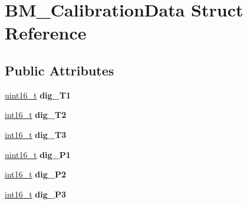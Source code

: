 \hypertarget{structBM__CalibrationData}{}\section{B\+M\+\_\+\+Calibration\+Data Struct Reference}
\label{structBM__CalibrationData}
\subsection*{Public Attributes}
\begin{DoxyCompactItemize}
\item 
\mbox{\label{structBM__CalibrationData_a1f0f0ad502c7ad302d1d75c41897326c}} 
\hyperlink{vl53l0x__types_8h_a273cf69d639a59973b6019625df33e30}{uint16\+\_\+t} {\bfseries dig\+\_\+\+T1}
\item 
\mbox{\label{structBM__CalibrationData_a5fa3b1681b52b9f3ef94c4600b464f24}} 
\hyperlink{vl53l0x__types_8h_aa343fa3b3d06292b959ffdd4c4703b06}{int16\+\_\+t} {\bfseries dig\+\_\+\+T2}
\item 
\mbox{\label{structBM__CalibrationData_a6a95bd8dc6e4750b4370c5277e762621}} 
\hyperlink{vl53l0x__types_8h_aa343fa3b3d06292b959ffdd4c4703b06}{int16\+\_\+t} {\bfseries dig\+\_\+\+T3}
\item 
\mbox{\label{structBM__CalibrationData_a229d9c150036f8013f98270f625c365b}} 
\hyperlink{vl53l0x__types_8h_a273cf69d639a59973b6019625df33e30}{uint16\+\_\+t} {\bfseries dig\+\_\+\+P1}
\item 
\mbox{\label{structBM__CalibrationData_a76509932ead2ddca230f134e9b50845b}} 
\hyperlink{vl53l0x__types_8h_aa343fa3b3d06292b959ffdd4c4703b06}{int16\+\_\+t} {\bfseries dig\+\_\+\+P2}
\item 
\mbox{\label{structBM__CalibrationData_a6496fa200d27486cb6767a9f4cfafe4c}} 
\hyperlink{vl53l0x__types_8h_aa343fa3b3d06292b959ffdd4c4703b06}{int16\+\_\+t} {\bfseries dig\+\_\+\+P3}
\item 
\mbox{\label{structBM__CalibrationData_acecdf9f195022df12f4f00df9185b0df}} 

\end{DoxyCompactItemize}
